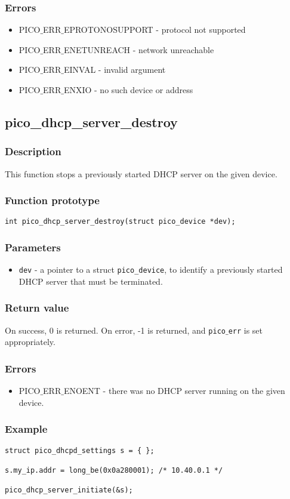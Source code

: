 \subsubsection*{Errors}
\begin{itemize}[noitemsep]
\item PICO$\_$ERR$\_$EPROTONOSUPPORT - protocol not supported
\item PICO$\_$ERR$\_$ENETUNREACH - network unreachable 
\item PICO$\_$ERR$\_$EINVAL - invalid argument
\item PICO$\_$ERR$\_$ENXIO - no such device or address
\end{itemize}

\subsection{pico\_dhcp\_server\_destroy}

\subsubsection*{Description}
This function stops a previously started DHCP server on the given device. 

\subsubsection*{Function prototype}
\texttt{int pico\_dhcp\_server\_destroy(struct pico\_device *dev);}

\subsubsection*{Parameters}
\begin{itemize}[noitemsep]
\item \texttt{dev} - a pointer to a struct \texttt{pico\_device}, to identify a previously started DHCP server that must be terminated. 
\end{itemize}

\subsubsection*{Return value}
On success, 0 is returned.
On error, -1 is returned, and \texttt{pico$\_$err} is set appropriately.

\subsubsection*{Errors}
\begin{itemize}[noitemsep]
\item PICO$\_$ERR$\_$ENOENT - there was no DHCP server running on the given device.
\end{itemize}

\subsubsection*{Example}
\begin{verbatim}
struct pico_dhcpd_settings s = { };

s.my_ip.addr = long_be(0x0a280001); /* 10.40.0.1 */

pico_dhcp_server_initiate(&s);
\end{verbatim}


